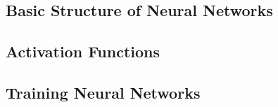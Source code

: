 \subsection{Basic Structure of Neural Networks}



\subsection{Activation Functions}


\subsection{Training Neural Networks}

